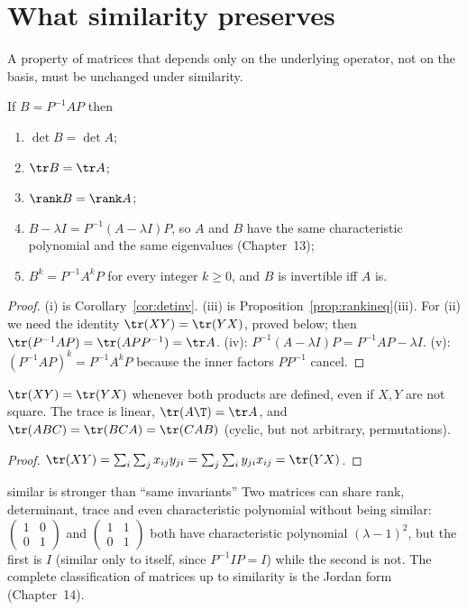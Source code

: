 \section{What similarity preserves}

A property of matrices that depends only on the underlying operator, not on the basis, must be unchanged under similarity.

\begin{theorem}\label{thm:simInv}
If $B=P^{-1}AP$ then
\begin{enumerate}[label=(\roman*)]
  \item $\det B=\det A$;
  \item $\tr B=\tr A$;
  \item $\rank B=\rank A$;
  \item $B-\lambda I=P^{-1}(A-\lambda I)P$, so $A$ and $B$ have the same characteristic polynomial and the same eigenvalues (Chapter~13);
  \item $B^k=P^{-1}A^kP$ for every integer $k\ge0$, and $B$ is invertible iff $A$ is.
\end{enumerate}
\end{theorem}

\begin{proof}
(i) is Corollary~\ref{cor:detinv}. (iii) is Proposition~\ref{prop:rankineq}(iii). For (ii) we need the identity $\tr(XY)=\tr(YX)$, proved below; then $\tr(P^{-1}AP)=\tr(APP^{-1})=\tr A$. (iv): $P^{-1}(A-\lambda I)P=P^{-1}AP-\lambda I$. (v): $(P^{-1}AP)^k=P^{-1}A^kP$ because the inner factors $PP^{-1}$ cancel.
\end{proof}

\begin{proposition}\label{prop:trace}
$\tr(XY)=\tr(YX)$ whenever both products are defined, even if $X,Y$ are not square. The trace is linear, $\tr(A\T)=\tr A$, and $\tr(ABC)=\tr(BCA)=\tr(CAB)$ (cyclic, but not arbitrary, permutations).
\end{proposition}

\begin{proof}
$\tr(XY)=\sum_i\sum_jx_{ij}y_{ji}=\sum_j\sum_iy_{ji}x_{ij}=\tr(YX)$.
\end{proof}

\begin{pitfall}{similar is stronger than ``same invariants''}
Two matrices can share rank, determinant, trace and even characteristic polynomial without being similar: $\begin{pmatrix}1&0\\0&1\end{pmatrix}$ and $\begin{pmatrix}1&1\\0&1\end{pmatrix}$ both have characteristic polynomial $(\lambda-1)^2$, but the first is $I$ (similar only to itself, since $P^{-1}IP=I$) while the second is not. The complete classification of matrices up to similarity is the Jordan form (Chapter~14).
\end{pitfall}

